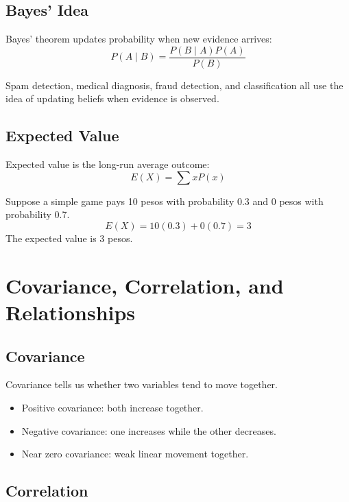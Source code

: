 \documentclass[11pt,a4paper]{article}
\begin{document}
\subsection{Bayes' Idea}

Bayes' theorem updates probability when new evidence arrives:
\[
P(A \mid B) = \frac{P(B \mid A)P(A)}{P(B)}
\]

\begin{conceptbox}
Spam detection, medical diagnosis, fraud detection, and classification all use the idea of updating beliefs when evidence is observed.
\end{conceptbox}

\subsection{Expected Value}

Expected value is the long-run average outcome:
\[
E(X) = \sum xP(x)
\]

\begin{examplebox}
Suppose a simple game pays 10 pesos with probability 0.3 and 0 pesos with probability 0.7.
\[
E(X) = 10(0.3) + 0(0.7) = 3
\]
The expected value is 3 pesos.
\end{examplebox}

\section{Covariance, Correlation, and Relationships}

\subsection{Covariance}

Covariance tells us whether two variables tend to move together.

\begin{itemize}[leftmargin=*]
  \item Positive covariance: both increase together.
  \item Negative covariance: one increases while the other decreases.
  \item Near zero covariance: weak linear movement together.
\end{itemize}

\subsection{Correlation}
\end{document}

